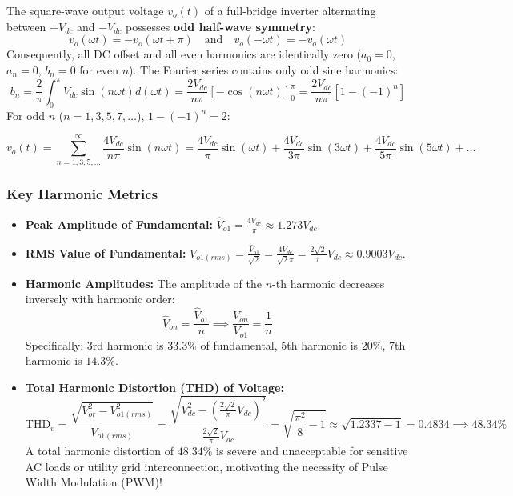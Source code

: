 \documentclass[11pt,a4paper]{article}
\begin{document}
The square-wave output voltage $v_o(t)$ of a full-bridge inverter alternating between $+V_{dc}$ and $-V_{dc}$ possesses \textbf{odd half-wave symmetry}:
\begin{equation}
v_o(\omega t) = -v_o(\omega t + \pi) \quad \text{and} \quad v_o(-\omega t) = -v_o(\omega t)
\end{equation}
Consequently, all DC offset and all even harmonics are identically zero ($a_0 = 0$, $a_n = 0$, $b_n = 0$ for even $n$). The Fourier series contains only odd sine harmonics:
\begin{equation}
b_n = \frac{2}{\pi} \int_0^\pi V_{dc} \sin(n\omega t) d(\omega t) = \frac{2V_{dc}}{n\pi} \left[-\cos(n\omega t)\right]_0^\pi = \frac{2V_{dc}}{n\pi} \left[1 - (-1)^n\right]
\end{equation}
For odd $n$ ($n = 1, 3, 5, 7, \dots$), $1 - (-1)^n = 2$:
\begin{formulabox}
\begin{equation}
v_o(t) = \sum_{n=1,3,5,\dots}^{\infty} \frac{4V_{dc}}{n\pi} \sin(n\omega t) = \frac{4V_{dc}}{\pi} \sin(\omega t) + \frac{4V_{dc}}{3\pi} \sin(3\omega t) + \frac{4V_{dc}}{5\pi} \sin(5\omega t) + \dots
\label{eq:fourier_square_full}
\end{equation}
\end{formulabox}

\subsubsection{Key Harmonic Metrics}
\begin{itemize}[leftmargin=*]
  \item \textbf{Peak Amplitude of Fundamental:} $\hat{V}_{o1} = \frac{4V_{dc}}{\pi} \approx 1.273 V_{dc}$.
  \item \textbf{RMS Value of Fundamental:} $V_{o1(rms)} = \frac{\hat{V}_{o1}}{\sqrt{2}} = \frac{4V_{dc}}{\sqrt{2}\pi} = \frac{2\sqrt{2}}{\pi}V_{dc} \approx 0.9003 V_{dc}$.
  \item \textbf{Harmonic Amplitudes:} The amplitude of the $n$-th harmonic decreases inversely with harmonic order:
  \begin{equation}
  \hat{V}_{on} = \frac{\hat{V}_{o1}}{n} \implies \frac{V_{on}}{V_{o1}} = \frac{1}{n}
  \end{equation}
  Specifically: 3rd harmonic is $33.3\%$ of fundamental, 5th harmonic is $20\%$, 7th harmonic is $14.3\%$.
  \item \textbf{Total Harmonic Distortion (THD) of Voltage:}
  \begin{equation}
  \text{THD}_v = \frac{\sqrt{V_{or}^2 - V_{o1(rms)}^2}}{V_{o1(rms)}} = \frac{\sqrt{V_{dc}^2 - \left(\frac{2\sqrt{2}}{\pi}V_{dc}\right)^2}}{\frac{2\sqrt{2}}{\pi}V_{dc}} = \sqrt{\frac{\pi^2}{8} - 1} \approx \sqrt{1.2337 - 1} = 0.4834 \implies 48.34\%
  \end{equation}
  A total harmonic distortion of $48.34\%$ is severe and unacceptable for sensitive AC loads or utility grid interconnection, motivating the necessity of Pulse Width Modulation (PWM)!
\end{itemize}
\end{document}
